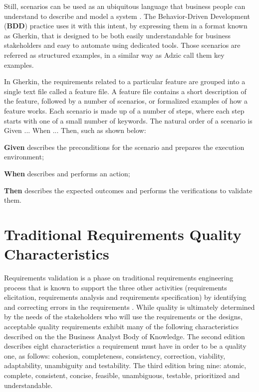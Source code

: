 Still, scenarios can be used as an ubiquitous language that business people can understand to describe and model a system \cite{Smart_2014}. The Behavior-Driven Development (\textbf{BDD}) practice uses it with this intent, by expressing them in a format known as Gherkin, that is designed to be both easily understandable for business stakeholders and easy to automate using dedicated tools. Those scenarios are referred as structured examples, in a similar way as Adzic \cite{Adzic_2011} call them key examples.

In Gherkin, the requirements related to a particular feature are grouped into a single text file called a feature file. A feature file contains a short description of the feature, followed by a number of scenarios, or formalized examples of how a feature works. Each scenario is made up of a number of steps, where each step starts with one of a small number of keywords. The natural order of a scenario is Given ... When ... Then, such as shown below:
\begin{framed}
\textbf{Given} describes the preconditions for the scenario and prepares the execution environment;

\textbf{When} describes and performs an action;

\textbf{Then} describes the expected outcomes and performs the verifications to validate them.
\end{framed}

\section{Traditional Requirements Quality Characteristics}

Requirements validation is a phase on traditional requirements engineering process that is known to support the three other activities (requirements elicitation, requirements analysis and requirements specification) by identifying and correcting errors in the requirements \cite{Heikkila_et_dot_al_2015}. While quality is ultimately determined by the needs of the stakeholders who will use the requirements or the designs, acceptable quality requirements exhibit many of the following characteristics described on the the Business Analyst Body of Knowledge. The second edition describes eight characteristics a requirement must have in order to be a quality one, as follows: cohesion, completeness, consistency, correction, viability, adaptability, unambiguity and testability. The third edition \cite{Babok_2015} bring nine: atomic, complete, consistent, concise, feasible, unambiguous, testable, prioritized and understandable.

